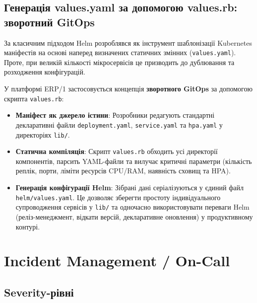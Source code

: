 \documentclass[12pt,a4paper]{article}
\begin{document}
\subsection{Генерація values.yaml за допомогою values.rb: зворотний GitOps}

За класичним підходом Helm розроблявся як інструмент шаблонізації Kubernetes маніфестів на основі наперед визначених статичних змінних (\texttt{values.yaml}). Проте, при великій кількості мікросервісів це призводить до дублювання та розходження конфігурацій.

У платформі ERP/1 застосовується концепція \textbf{зворотного GitOps} за допомогою скрипта \texttt{values.rb}:

\begin{itemize}
    \item \textbf{Маніфест як джерело істини}: Розробники редагують стандартні декларативні файли \texttt{deployment.yaml}, \texttt{service.yaml} та \texttt{hpa.yaml} у директоріях \texttt{lib/}.
    \item \textbf{Статична компіляція}: Скрипт \texttt{values.rb} обходить усі директорії компонентів, парсить YAML-файли та вилучає критичні параметри (кількість реплік, порти, ліміти ресурсів CPU/RAM, наявність сховищ та HPA).
    \item \textbf{Генерація конфігурації Helm}: Зібрані дані серіалізуються у єдиний файл \texttt{helm/values.yaml}. Це дозволяє зберегти простоту індивідуального супроводження сервісів у \texttt{lib/} та одночасно використовувати переваги Helm (реліз-менеджмент, відкати версій, декларативне оновлення) у продуктивному контурі.
\end{itemize}

\newpage
\section{Incident Management / On-Call}

\subsection{Severity-рівні}
\end{document}
